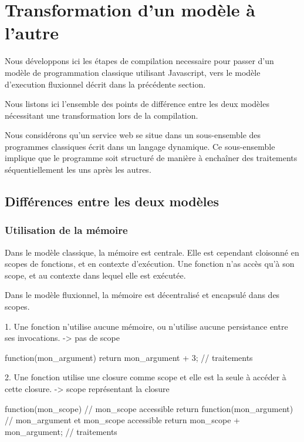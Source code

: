 \section{Transformation d'un modèle à l'autre}

	Nous développons ici les étapes de compilation necessaire pour passer d'un modèle de programmation classique utilisant Javascript, vers le modèle d'execution fluxionnel décrit dans la précédente section.

	Nous listons ici l'ensemble des points de différence entre les deux modèles nécessitant une transformation lors de la compilation.

	Nous considérons qu'un service web se situe dans un sous-ensemble des programmes classiques écrit dans un langage dynamique.
	Ce sous-ensemble implique que le programme soit structuré de manière à enchaîner des traitements séquentiellement les uns après les autres.

	\subsection{Différences entre les deux modèles}

		\subsubsection{Utilisation de la mémoire}

			Dans le modèle classique, la mémoire est centrale.
			Elle est cependant cloisonné en scopes de fonctions, et en contexte d'exécution.
			Une fonction n'as accès qu'à son scope, et au contexte dans lequel elle est exécutée.

			Dans le modèle fluxionnel, la mémoire est décentralisé et encapsulé dans des scopes.

			1. Une fonction n'utilise aucune mémoire, ou n'utilise aucune persistance entre ses invocations.
			    -> pas de scope

			\begin{code}[Javascript, caption={Code fluxionnel},label={lst:mem1}]
				function(mon_argument) {
				    return mon_argument + 3; // traitements
				}
			\end{code}


			2. Une fonction utilise une closure comme scope et elle est la seule à accéder à cette closure.
			    -> scope représentant la closure

			\begin{code}[Javascript, caption={Code fluxionnel},label={lst:mem2}]
				function(mon_scope) {
				    // mon_scope accessible
				    return function(mon_argument) {
				        // mon_argument et mon_scope accessible
				        return mon_scope + mon_argument; // traitements
				    }
				}
			\end{code}

